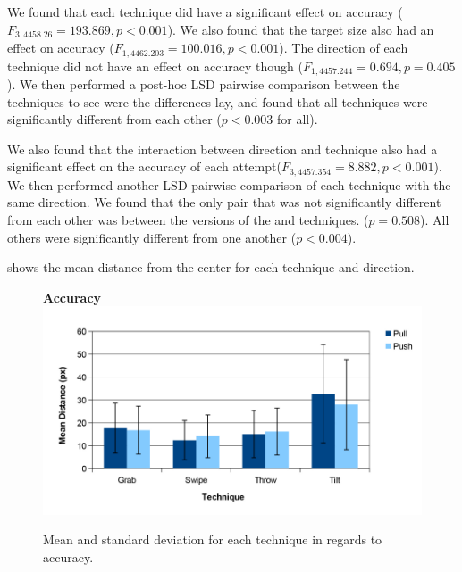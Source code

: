 We found that each technique did have a significant effect on accuracy ($F_{3,4458.26}=193.869, p<0.001$).
We also found that the target size also had an effect on accuracy ($F_{1,4462.203}=100.016, p<0.001$).
The direction of each technique did not have an effect on accuracy though ($F_{1,4457.244}=0.694, p=0.405$). 
We then performed a post-hoc LSD pairwise comparison between the techniques to see were the differences lay, and found that all techniques were significantly different from each other ($p<0.003$ for all).

We also found that the interaction between direction and technique also had a significant effect on the accuracy of each attempt($F_{3,4457.354}=8.882, p<0.001$). 
We then performed another LSD pairwise comparison of each technique with the same direction. 
We found that the only pair that was not significantly different from each other was between the \pull versions of the \grab and \throw techniques. ($p=0.508$). 
All others were significantly different from one another ($p<0.004$). 

 shows the mean distance from the center for each technique and direction.
\begin{figure}[H]{
	\centering
	\textbf{Accuracy}\\[4pt]
	\includegraphics[width = 1\columnwidth ]{images/distance_graph.pdf}} 
	\caption{
		Mean and standard deviation for each technique in regards to accuracy.
	}
	\label{fig:accuracyGraph}
\end{figure}




